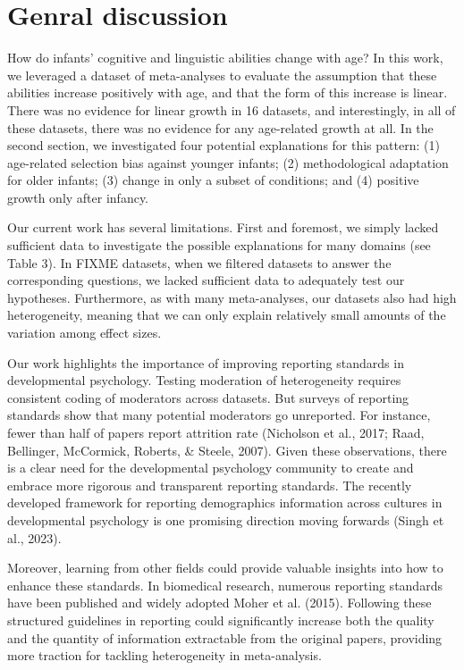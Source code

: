 \documentclass[
  man]{apa6}
\begin{document}
\hypertarget{genral-discussion}{%
\section{Genral discussion}\label{genral-discussion}}

How do infants' cognitive and linguistic abilities change with age? In this work, we leveraged a dataset of meta-analyses to evaluate the assumption that these abilities increase positively with age, and that the form of this increase is linear. There was no evidence for linear growth in 16 datasets, and interestingly, in all of these datasets, there was no evidence for any age-related growth at all. In the second section, we investigated four potential explanations for this pattern: (1) age-related selection bias against younger infants; (2) methodological adaptation for older infants; (3) change in only a subset of conditions; and (4) positive growth only after infancy.

Our current work has several limitations. First and foremost, we simply lacked sufficient data to investigate the possible explanations for many domains (see Table 3). In FIXME datasets, when we filtered datasets to answer the corresponding questions, we lacked sufficient data to adequately test our hypotheses. Furthermore, as with many meta-analyses, our datasets also had high heterogeneity, meaning that we can only explain relatively small amounts of the variation among effect sizes.

Our work highlights the importance of improving reporting standards in developmental psychology. Testing moderation of heterogeneity requires consistent coding of moderators across datasets. But surveys of reporting standards show that many potential moderators go unreported. For instance, fewer than half of papers report attrition rate (Nicholson et al., 2017; Raad, Bellinger, McCormick, Roberts, \& Steele, 2007). Given these observations, there is a clear need for the developmental psychology community to create and embrace more rigorous and transparent reporting standards. The recently developed framework for reporting demographics information across cultures in developmental psychology is one promising direction moving forwards (Singh et al., 2023).

Moreover, learning from other fields could provide valuable insights into how to enhance these standards. In biomedical research, numerous reporting standards have been published and widely adopted Moher et al. (2015). Following these structured guidelines in reporting could significantly increase both the quality and the quantity of information extractable from the original papers, providing more traction for tackling heterogeneity in meta-analysis.
\end{document}

